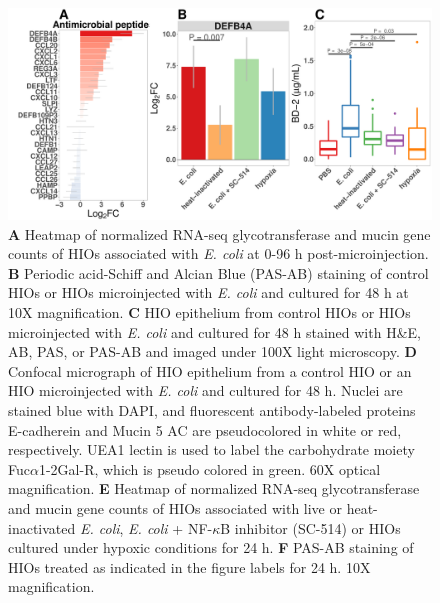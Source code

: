 \documentclass[9pt,lineo]{elife}
\begin{document}
\begin{figure}
\begin{fullwidth}
\centering
\includegraphics[width=0.9\linewidth]{./figures/figure6/figure6_multipanel.pdf}
\caption{\textbf{A} Heatmap of normalized RNA-seq glycotransferase and mucin gene counts of HIOs associated with \textit{E. coli} at 0-96 h post-microinjection. \textbf{B} Periodic acid-Schiff and Alcian Blue (PAS-AB) staining of control HIOs or HIOs microinjected with \textit{E. coli} and cultured for 48 h at 10X magnification. \textbf{C} HIO epithelium from control HIOs or HIOs microinjected with \textit{E. coli} and cultured for 48 h stained with H\&E, AB, PAS, or PAS-AB and imaged under 100X light microscopy. \textbf{D} Confocal micrograph of HIO epithelium from a control HIO or an HIO microinjected with \textit{E. coli} and cultured for 48 h. Nuclei are stained blue with DAPI, and fluorescent antibody-labeled proteins E-cadherein and Mucin 5 AC are pseudocolored in white or red, respectively. UEA1 lectin is used to label the carbohydrate moiety Fuc$\alpha$1-2Gal-R, which is pseudo colored in green. 60X optical magnification. \textbf{E} Heatmap of normalized RNA-seq glycotransferase and mucin gene counts of HIOs associated with live or heat-inactivated \textit{E. coli}, \textit{E. coli} + NF-$\kappa$B inhibitor (SC-514) or HIOs cultured under hypoxic conditions for 24 h. \textbf{F} PAS-AB staining of HIOs treated as indicated in the figure labels for 24 h. 10X magnification.}
\label{fig:fullwidth}
\end{fullwidth}
\end{figure}
\end{document}
